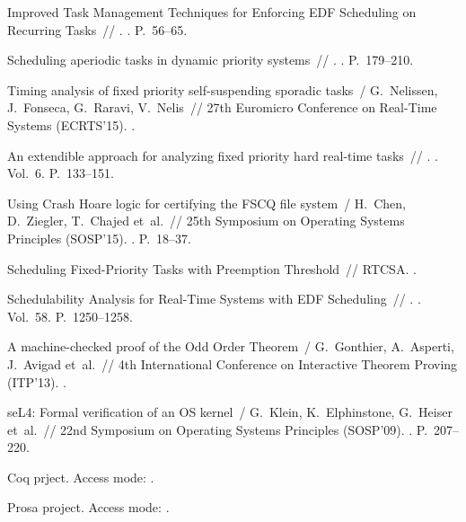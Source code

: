 \begin{thebibliography}{10}
 Improved Task Management Techniques for Enforcing EDF
  Scheduling on Recurring Tasks~// . \BibDash
{}. \BibDash
\newblock P.~56--65.

 Scheduling aperiodic tasks in dynamic
  priority systems~// . \BibDash
{}. \BibDash
\newblock P.~179--210.

Timing analysis of fixed priority self-suspending sporadic tasks~/ G.~Nelissen,
  J.~Fonseca, G.~Raravi, V.~Nelis~// 27th Euromicro Conference on Real-Time
  Systems (ECRTS’15). \BibDash
{}.

 An extendible approach for
  analyzing fixed priority hard real-time tasks~// .
  \BibDash
{}. \BibDash
\newblock Vol.~6. \BibDash
\newblock P.~133--151.

Using Crash Hoare logic for certifying the FSCQ file system~/ H.~Chen,
  D.~Ziegler, T.~Chajed et~al.~// 25th Symposium on Operating Systems
  Principles (SOSP’15). \BibDash
{}. \BibDash
\newblock P.~18--37.

 Scheduling Fixed-Priority Tasks with Preemption
  Threshold~// RTCSA. \BibDash
{}.

 Schedulability Analysis for Real-Time Systems with
  EDF Scheduling~// . \BibDash
{}. \BibDash
\newblock Vol.~58. \BibDash
\newblock P.~1250--1258.

A machine-checked proof of the Odd Order Theorem~/ G.~Gonthier, A.~Asperti,
  J.~Avigad et~al.~// 4th International Conference on Interactive Theorem
  Proving (ITP’13). \BibDash
{}.

seL4: Formal verification of an OS kernel~/ G.~Klein, K.~Elphinstone, G.~Heiser
  et~al.~// 22nd Symposium on Operating Systems Principles (SOSP’09).
  \BibDash
{}. \BibDash
\newblock P.~207--220.

Coq prject. \BibDash
\newblock Access mode: .

Prosa project. \BibDash
\newblock Access mode: .

\end{thebibliography}
